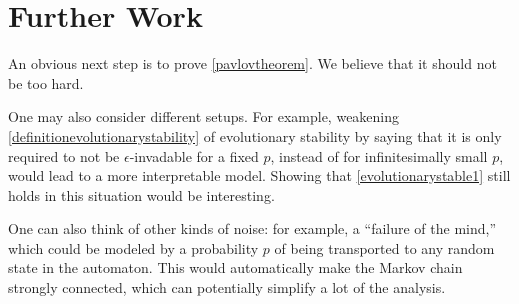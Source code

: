 \documentclass[12pt]{article}
\theoremstyle{definition}
\newtheorem{lemma}[theorem]{Lemma}
\theoremstyle{remark}
\begin{document}
    \section{Further Work}
    \label{sectiondiscussion}

    An obvious next step is to prove \cref{pavlovtheorem}. We believe that it should not be too hard.

    One may also consider different setups. For example, weakening \cref{definitionevolutionarystability} of evolutionary stability by saying that it is only required to not be $\epsilon$-invadable for a fixed $p$, instead of for infinitesimally small $p$, would lead to a more interpretable model. Showing that \cref{evolutionarystable1} still holds in this situation would be interesting.
    
    One can also think of other kinds of noise: for example, a ``failure of the mind,'' which could be modeled by a probability $p$ of being transported to any random state in the automaton. This would automatically make the Markov chain strongly connected, which can potentially simplify a lot of the analysis.









\end{document}
